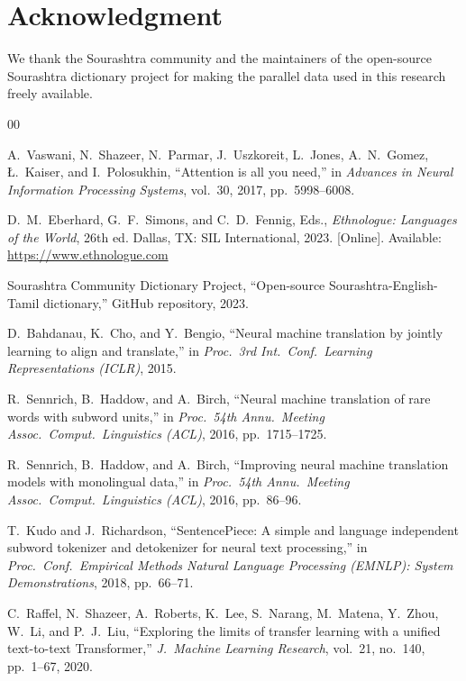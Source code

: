 \documentclass[conference]{IEEEtran}
\begin{document}
\section*{Acknowledgment}

We thank the Sourashtra community and the maintainers of the open-source Sourashtra dictionary project for making the parallel data used in this research freely available.

\begin{thebibliography}{00}

A.~Vaswani, N.~Shazeer, N.~Parmar, J.~Uszkoreit, L.~Jones, A.~N.~Gomez, \L.~Kaiser, and I.~Polosukhin, ``Attention is all you need,'' in \textit{Advances in Neural Information Processing Systems}, vol.~30, 2017, pp.~5998--6008.

D.~M.~Eberhard, G.~F.~Simons, and C.~D.~Fennig, Eds., \textit{Ethnologue: Languages of the World}, 26th ed. Dallas, TX: SIL International, 2023. [Online]. Available: \url{https://www.ethnologue.com}

Sourashtra Community Dictionary Project, ``Open-source Sourashtra-English-Tamil dictionary,'' GitHub repository, 2023.

D.~Bahdanau, K.~Cho, and Y.~Bengio, ``Neural machine translation by jointly learning to align and translate,'' in \textit{Proc.\ 3rd Int.\ Conf.\ Learning Representations (ICLR)}, 2015.

R.~Sennrich, B.~Haddow, and A.~Birch, ``Neural machine translation of rare words with subword units,'' in \textit{Proc.\ 54th Annu.\ Meeting Assoc.\ Comput.\ Linguistics (ACL)}, 2016, pp.~1715--1725.

R.~Sennrich, B.~Haddow, and A.~Birch, ``Improving neural machine translation models with monolingual data,'' in \textit{Proc.\ 54th Annu.\ Meeting Assoc.\ Comput.\ Linguistics (ACL)}, 2016, pp.~86--96.

T.~Kudo and J.~Richardson, ``SentencePiece: A simple and language independent subword tokenizer and detokenizer for neural text processing,'' in \textit{Proc.\ Conf.\ Empirical Methods Natural Language Processing (EMNLP): System Demonstrations}, 2018, pp.~66--71.

C.~Raffel, N.~Shazeer, A.~Roberts, K.~Lee, S.~Narang, M.~Matena, Y.~Zhou, W.~Li, and P.~J.~Liu, ``Exploring the limits of transfer learning with a unified text-to-text Transformer,'' \textit{J.\ Machine Learning Research}, vol.~21, no.~140, pp.~1--67, 2020.


\end{thebibliography}
\end{document}
